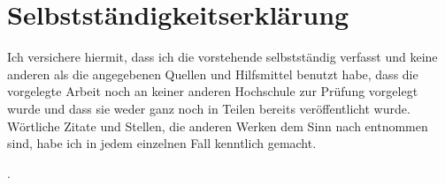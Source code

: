 
\section*{Selbstständigkeitserklärung}

Ich versichere hiermit, dass ich die vorstehende  selbstständig verfasst und keine anderen als die angegebenen Quellen und Hilfsmittel benutzt habe, dass die vorgelegte Arbeit noch an keiner anderen Hochschule zur Prüfung vorgelegt wurde und dass sie weder ganz noch in Teilen bereits veröffentlicht wurde. Wörtliche Zitate und Stellen, die anderen Werken dem Sinn nach entnommen sind, habe ich in jedem einzelnen Fall kenntlich gemacht.

\vspace{\baselineskip}

\noindent%
\number{}.~~

\vspace{3\baselineskip}

\noindent \thesisauthor

\thispagestyle{empty}